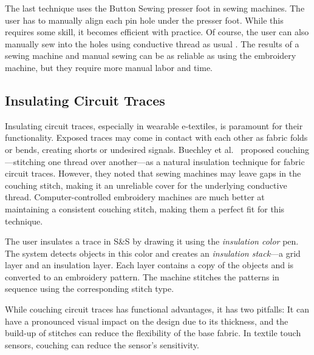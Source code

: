 \documentclass[header.tex]{subfiles}
\begin{document}



The last technique uses the Button Sewing presser foot in sewing machines. The user has to manually align each pin hole under the presser foot. While this requires some skill, it becomes efficient with practice. Of course, the user can also manually sew into the holes using conductive thread as usual \cite{Buechley:2008:LAU:1357054.1357123}.
The results of a sewing machine and manual sewing can be as reliable as using the embroidery machine, but they require more manual labor and time.


\subsection{Insulating Circuit Traces}
Insulating circuit traces, especially in wearable e-textiles, is paramount for their functionality. %
Exposed traces may come in contact with each other as fabric folds or bends, creating shorts or undesired signals. Buechley et al.\ \cite{Buechley2009} proposed couching---stitching one thread over another---as a natural insulation technique for fabric circuit traces. However, they noted that sewing machines may leave gaps in the couching stitch, making it an unreliable cover for the underlying conductive thread. Computer-controlled embroidery machines are much better at maintaining a consistent couching stitch, making them a perfect fit for this technique. 

The user insulates a trace in S\&S by drawing it using the \textit{insulation color} pen. The system detects objects in this color and creates an \textit{insulation stack}---a grid layer and an insulation layer. Each layer contains a copy of the objects and is converted to an embroidery pattern. The machine stitches the patterns in sequence using the corresponding stitch type. 



While couching circuit traces has functional advantages, it has two pitfalls: It can have a pronounced visual impact on the design due to its thickness, and the build-up of stitches can reduce the flexibility of the base fabric. In textile touch sensors, couching can reduce the sensor's sensitivity.
\end{document}

